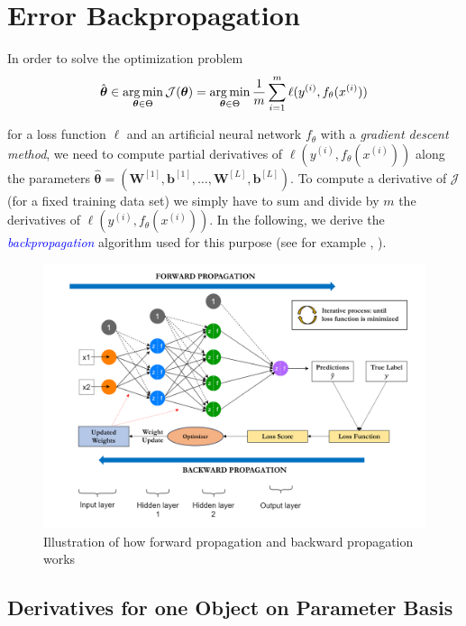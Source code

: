 \section{Error Backpropagation}
In order to solve the optimization problem
\begin{equation}
    \hat{\boldsymbol{\theta}} \in \operatorname*{arg\,min}_{\boldsymbol{\theta} \in \Theta} \mathcal{J}(\boldsymbol{\theta}) = \operatorname*{arg\,min}_{\boldsymbol{\theta} \in \Theta} \frac{1}{m} \sum_{i=1}^{m} \ell(y^{(i)}, f_\theta(x^{(i)}))
    \label{eqn:56}
\end{equation}

for a loss function $\ell$ and an artificial neural network $f_{\theta}$ with a \emph{gradient descent method}, we need to compute partial derivatives of $\ell(y^{(i)}, f_\theta(x^{(i)}))$ along the parameters $\hat{\boldsymbol{\theta}} = (\boldsymbol{W}^{[1]}, \boldsymbol{b}^{[1]}, \ldots, \boldsymbol{W}^{[L]}, \boldsymbol{b}^{[L]})$. To compute a derivative of $\mathcal{J}$ (for a fixed training data set) we simply have to sum and divide by $m$ the derivatives of $\ell(y^{(i)}, f_\theta(x^{(i)}))$. In the following, we derive the \textcolor{blue}{\emph{backpropagation}} algorithm used for this purpose (see for example \cite[section 6.5]{goodfellow2016deep}, \cite[section 5.3]{bishop2006pattern}).

\begin{figure}[h!]
    \centering
    \includegraphics[width=\textwidth]{images/figure10.png}
    \caption{Illustration of how forward propagation and backward propagation works}
    \label{fig:10}
\end{figure}

\subsection{Derivatives for one Object on Parameter Basis}

